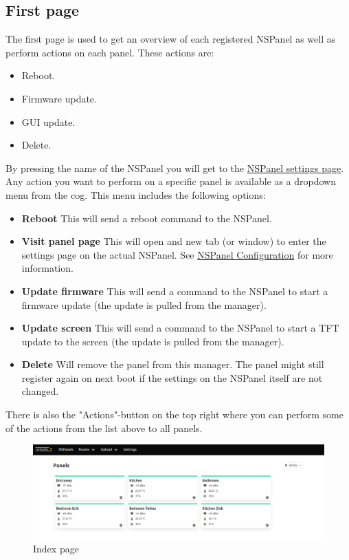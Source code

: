 \documentclass[10pt]{article}
\begin{document}
    \subsection{First page}
    The first page is used to get an overview of each registered NSPanel as well as perform actions on each panel. These actions are:
    \begin{itemize}
      \item Reboot.
      \item Firmware update.
      \item GUI update.
      \item Delete.
    \end{itemize}
    By pressing the name of the NSPanel you will get to the \hyperref[sec:nspanel_page]{NSPanel settings page}. Any action you want to perform on a specific panel is available as a dropdown menu from the cog. This menu includes the following options:
    \begin{itemize}
      \item \textbf{Reboot} This will send a reboot command to the NSPanel.
      \item \textbf{Visit panel page} This will open and new tab (or window) to enter the settings page on the actual NSPanel. See \hyperref[sec:nspanel_configuration]{NSPanel Configuration} for more information.
      \item \textbf{Update firmware} This will send a command to the NSPanel to start a firmware update (the update is pulled from the manager).
      \item \textbf{Update screen} This will send a command to the NSPanel to start a TFT update to the screen (the update is pulled from the manager).
      \item \textbf{Delete} Will remove the panel from this manager. The panel might still register again on next boot if the settings on the NSPanel itself are not changed.
    \end{itemize}
    There is also the "Actions"-button on the top right where you can perform some of the actions from the list above to all panels.

    \begin{figure}[H]
    \centering
    \includegraphics[width=\textwidth,height=\textheight,keepaspectratio]{index_page.png}
    \caption{Index page}%
    \end{figure}
\end{document}
